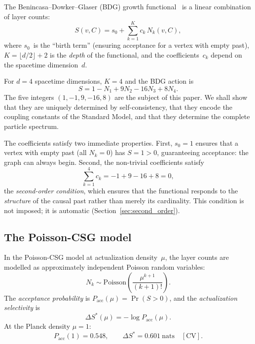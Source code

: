 \documentclass[12pt,a4paper]{article}
\begin{document}
The Benincasa--Dowker--Glaser (BDG) growth functional~\cite{BenincasaDowker2010,DowkerGlaser2013,Glaser2014} is a linear combination of layer counts:
\begin{equation}
S(v,C) = s_0 + \sum_{k=1}^{K} c_k\, N_k(v,C),
\label{eq:bdg_general}
\end{equation}
where $s_0$~is the ``birth term'' (ensuring acceptance for a vertex with empty past), $K = \lfloor d/2\rfloor + 2$ is the \emph{depth} of the functional, and the coefficients~$c_k$ depend on the spacetime dimension~$d$.

For $d=4$ spacetime dimensions, $K=4$ and the BDG action is
\begin{equation}
\boxed{S = 1 - N_1 + 9N_2 - 16N_3 + 8N_4.}
\label{eq:bdg_d4}
\end{equation}
The five integers $(1,-1,9,-16,8)$ are the subject of this paper. We shall show that they are uniquely determined by self-consistency, that they encode the coupling constants of the Standard Model, and that they determine the complete particle spectrum.

The coefficients satisfy two immediate properties. First, $s_0 = 1$ ensures that a vertex with empty past (all $N_k = 0$) has $S=1>0$, guaranteeing acceptance: the graph can always begin. Second, the non-trivial coefficients satisfy
\begin{equation}
\sum_{k=1}^{4}c_k = -1+9-16+8 = 0,
\label{eq:second_order_sum}
\end{equation}
the \emph{second-order condition}, which ensures that the functional responds to the \emph{structure} of the causal past rather than merely its cardinality. This condition is not imposed; it is automatic (Section~\ref{sec:second_order}).

\subsection{The Poisson-CSG model}\label{sec:poisson}

In the Poisson-CSG model at actualization density~$\mu$, the layer counts are modelled as approximately independent Poisson random variables:
\begin{equation}
N_k \sim \mathrm{Poisson}\!\left(\frac{\mu^{k+1}}{(k+1)!}\right).
\label{eq:poisson}
\end{equation}
The \emph{acceptance probability} is $P_{\mathrm{acc}}(\mu) = \Pr(S > 0)$, and the \emph{actualization selectivity} is
\begin{equation}
\Delta S^*(\mu) = -\log P_{\mathrm{acc}}(\mu).
\label{eq:selectivity}
\end{equation}
At the Planck density $\mu=1$:
\begin{equation}
P_{\mathrm{acc}}(1) = 0.548, \qquad \Delta S^* = 0.601~\text{nats} \quad[\text{CV}].
\label{eq:pacc}
\end{equation}
\end{document}
